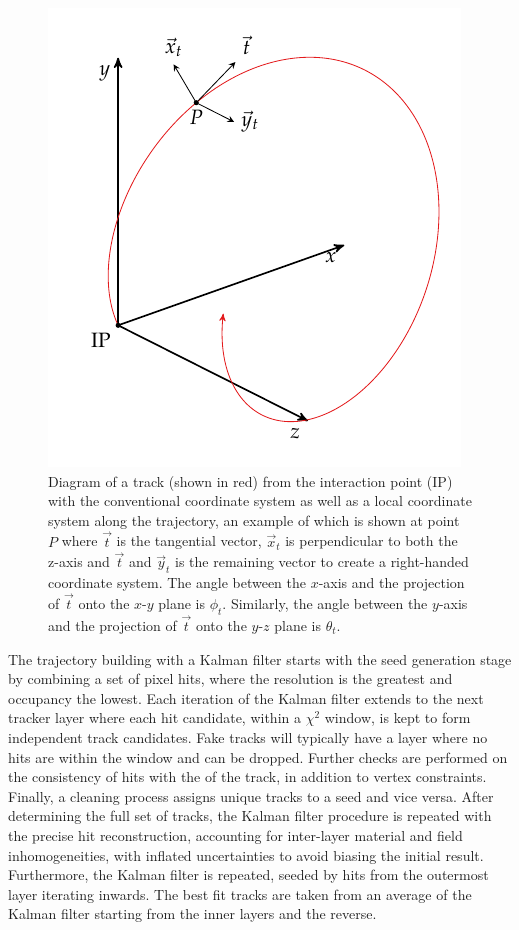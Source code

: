 \begin{figure}
    \centering
    \includegraphics{diagrams/tikz/kf_parameters/kf_parameters.pdf}
    \caption[Coordinate system to describe the curved path of a charged particle within an magnetic field.]{
        Diagram of a track (shown in red) from the interaction point (IP) with
        the conventional \CMS coordinate system as well as a local coordinate
        system along the trajectory, an example of which is shown at point $P$
        where $\vec{t}$ is the tangential vector, $\vec{x}_{t}$ is
        perpendicular to both the z-axis and $\vec{t}$ and $\vec{y}_{t}$ is
        the remaining vector to create a right-handed coordinate system. The
        angle between the $x$-axis and the projection of ${\vec{t}}$ onto the
        $x$-$y$ plane is $\phi_t$. Similarly, the angle between the $y$-axis
        and the projection of ${\vec{t}}$ onto the $y$-$z$ plane is $\theta_t$.
    }
    \label{fig:kf_parameters}
\end{figure}

The trajectory building with a Kalman filter starts with the seed generation
stage by combining a set of pixel hits, where the resolution is the
greatest and occupancy the lowest. Each iteration of the Kalman filter extends
to the next tracker layer where each hit candidate, within a $\chi^2$ window,
is kept to form independent track candidates. Fake tracks will typically have
a layer where no hits are within the window and can be dropped. Further checks
are performed on the consistency of hits with the \pt of the track, in addition to vertex constraints. Finally, a cleaning process assigns unique tracks to a
seed and vice versa. After determining the full set of tracks, the Kalman
filter procedure is repeated with the precise hit reconstruction, accounting
for inter-layer material and field inhomogeneities, with inflated
uncertainties to avoid biasing the initial result. Furthermore, the Kalman
filter is repeated, seeded by hits from the outermost layer iterating inwards.
The best fit tracks are taken from an average of the Kalman filter starting
from the inner layers and the reverse.

